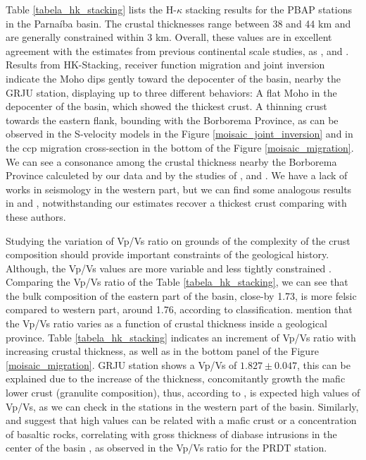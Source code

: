 \documentclass[paper,11pt]{geophysics}
\begin{document}
Table \ref{tabela_hk_stacking} lists the H-$\kappa$ stacking results for the PBAP stations in the Parnaíba basin. The crustal thicknesses range between 38 and 44 km and are generally constrained within 3 km. Overall, these values are in excellent agreement with the estimates from previous continental scale studies, as \cite{feng_upper_2007}, \cite{lloyd_moho_2010} and \cite{assumpcao_crustal_2013}. Results from HK-Stacking, receiver function migration and joint inversion indicate the Moho dips gently toward the depocenter of the basin, nearby the GRJU station, displaying up to three different behaviors: A flat Moho in the depocenter of the basin, which showed the thickest crust. A thinning crust towards the eastern flank, bounding with the Borborema Province, as can be observed in the S-velocity models in the Figure \ref{moisaic_joint_inversion} and in the ccp migration cross-section in the bottom of the Figure \ref{moisaic_migration}. We can see a consonance among the crustal thickness nearby the Borborema Province calculeted by our data and by the studies of \cite{pavao_upper_lower_2013}, \cite{almeida_crustal_2015} and \cite{luz_bulk_2015}. We have a lack of works in seismology in the western part, but we can find some analogous results in \cite{de_castro_crustal_2014} and \cite{daly_brasiliano_2014}, notwithstanding our estimates recover a thickest crust comparing with these authors.

Studying the variation of Vp/Vs ratio on grounds of the complexity of the crust composition should provide important constraints of the geological history. Although, the Vp/Vs values are more variable and less tightly constrained \citep{julia_deep_2008}. Comparing the Vp/Vs ratio of the Table \ref{tabela_hk_stacking}, we can see that the bulk composition of the eastern part of the basin, close-by 1.73, is more felsic compared to  western part, around 1.76, according to \cite{christensen_poissons_1996} classification. \cite{chevrot_australia_2000} mention that the Vp/Vs ratio varies as a function of crustal thickness inside a geological province. Table \ref{tabela_hk_stacking} indicates an increment of Vp/Vs ratio with increasing crustal thickness, as well as in the bottom panel of the Figure \ref{moisaic_migration}. GRJU station shows a Vp/Vs of $1.827\pm 0.047$, this can be explained due to the increase of the thickness, concomitantly growth the mafic lower crust (granulite composition), thus, according to \cite{christensen_poissons_1996}, is expected high values of Vp/Vs, as we can check in the stations in the western part of the basin. Similarly, \cite{christensen_poissons_1996} and \cite{julia_deep_2008} suggest that high values can be related with a mafic crust or a concentration of basaltic rocks, correlating with gross thickness of diabase intrusions in the center of the basin \citep{daly_brasiliano_2014}, as observed in the Vp/Vs ratio for the PRDT station.
\end{document}
